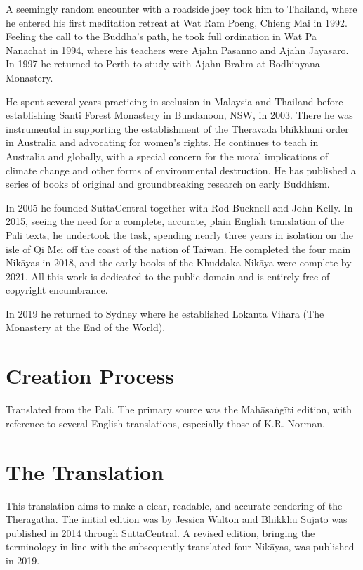 \documentclass[12pt,openany]{book}%
\begin{document}
A seemingly random encounter with a roadside joey took him to Thailand, where he entered his first meditation retreat at Wat Ram Poeng, Chieng Mai in 1992. Feeling the call to the Buddha’s path, he took full ordination in Wat Pa Nanachat in 1994, where his teachers were Ajahn Pasanno and Ajahn Jayasaro. In 1997 he returned to Perth to study with Ajahn Brahm at Bodhinyana Monastery. 

He spent several years practicing in seclusion in Malaysia and Thailand before establishing Santi Forest Monastery in Bundanoon, NSW, in 2003. There he was instrumental in supporting the establishment of the Theravada bhikkhuni order in Australia and advocating for women’s rights. He continues to teach in Australia and globally, with a special concern for the moral implications of climate change and other forms of environmental destruction. He has published a series of books of original and groundbreaking research on early Buddhism. 

In 2005 he founded SuttaCentral together with Rod Bucknell and John Kelly. In 2015, seeing the need for a complete, accurate, plain English translation of the Pali texts, he undertook the task, spending nearly three years in isolation on the isle of Qi Mei off the coast of the nation of Taiwan. He completed the four main \textsanskrit{Nikāyas} in 2018, and the early books of the Khuddaka \textsanskrit{Nikāya} were complete by 2021. All this work is dedicated to the public domain and is entirely free of copyright encumbrance. 

In 2019 he returned to Sydney where he established Lokanta Vihara (The Monastery at the End of the World). 

\section*{Creation Process}

Translated from the Pali. The primary source was the \textsanskrit{Mahāsaṅgīti} edition, with reference to several English translations, especially those of K.R. Norman.

\section*{The Translation}

This translation aims to make a clear, readable, and accurate rendering of the \textsanskrit{Theragāthā}. The initial edition was by Jessica Walton and Bhikkhu Sujato was published in 2014 through SuttaCentral. A revised edition, bringing the terminology in line with the subsequently-translated four \textsanskrit{Nikāyas}, was published in 2019.
\end{document}
